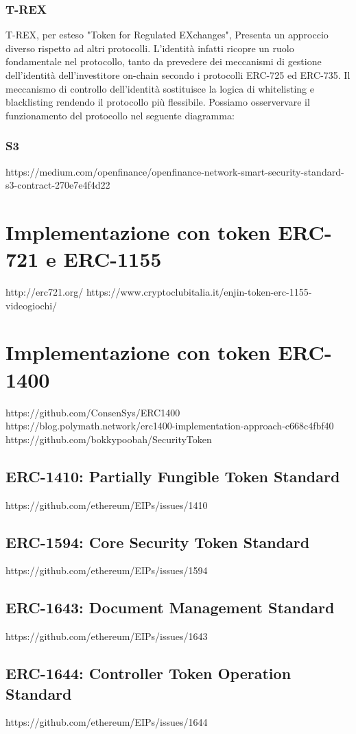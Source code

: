 \subsubsection{T-REX}
T-REX, per esteso "Token for Regulated EXchanges", Presenta un approccio diverso rispetto ad altri protocolli. L'identità infatti ricopre un ruolo fondamentale nel protocollo, tanto da prevedere dei meccanismi di gestione dell'identità dell'investitore on-chain secondo i protocolli ERC-725 ed ERC-735. Il meccanismo di controllo dell'identità sostituisce la logica di whitelisting e blacklisting rendendo il protocollo più flessibile. Possiamo osservervare il funzionamento del protocollo nel seguente diagramma: 

\subsubsection{S3}
https://medium.com/openfinance/openfinance-network-smart-security-standard-s3-contract-270e7e4f4d22


\section{Implementazione con token ERC-721 e ERC-1155}
http://erc721.org/
https://www.cryptoclubitalia.it/enjin-token-erc-1155-videogiochi/
\section{Implementazione con token ERC-1400}
https://github.com/ConsenSys/ERC1400
https://blog.polymath.network/erc1400-implementation-approach-c668c4fbf40
https://github.com/bokkypoobah/SecurityToken
\subsection{ERC-1410: Partially Fungible Token Standard}
https://github.com/ethereum/EIPs/issues/1410
\subsection{ERC-1594: Core Security Token Standard}
https://github.com/ethereum/EIPs/issues/1594
\subsection{ERC-1643: Document Management Standard}
https://github.com/ethereum/EIPs/issues/1643
\subsection{ERC-1644: Controller Token Operation Standard}
https://github.com/ethereum/EIPs/issues/1644

